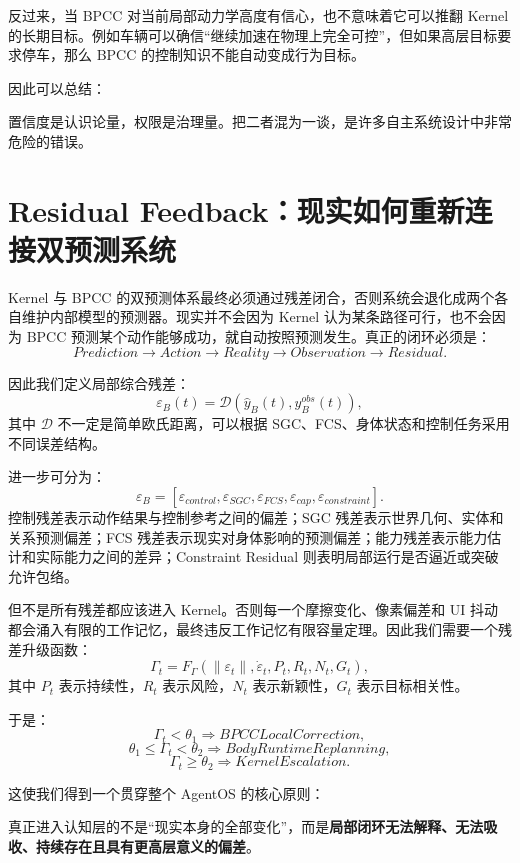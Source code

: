 反过来，当 BPCC 对当前局部动力学高度有信心，也不意味着它可以推翻 Kernel 的长期目标。例如车辆可以确信“继续加速在物理上完全可控”，但如果高层目标要求停车，那么 BPCC 的控制知识不能自动变成行为目标。

因此可以总结：
\begin{statementbox}
\centering
{}
\end{statementbox}
置信度是认识论量，权限是治理量。把二者混为一谈，是许多自主系统设计中非常危险的错误。

\section{Residual Feedback：现实如何重新连接双预测系统}

Kernel 与 BPCC 的双预测体系最终必须通过残差闭合，否则系统会退化成两个各自维护内部模型的预测器。现实并不会因为 Kernel 认为某条路径可行，也不会因为 BPCC 预测某个动作能够成功，就自动按照预测发生。真正的闭环必须是：
\[
Prediction
\rightarrow
Action
\rightarrow
Reality
\rightarrow
Observation
\rightarrow
Residual.
\]

因此我们定义局部综合残差：
\[
\varepsilon_B(t)
=
\mathcal D
\left(
\hat y_B(t),
y_B^{obs}(t)
\right),
\]
其中 $\mathcal D$ 不一定是简单欧氏距离，可以根据 SGC、FCS、身体状态和控制任务采用不同误差结构。

进一步可分为：
\[
\varepsilon_B
=
\left[
\varepsilon_{control},
\varepsilon_{SGC},
\varepsilon_{FCS},
\varepsilon_{cap},
\varepsilon_{constraint}
\right].
\]
控制残差表示动作结果与控制参考之间的偏差；SGC 残差表示世界几何、实体和关系预测偏差；FCS 残差表示现实对身体影响的预测偏差；能力残差表示能力估计和实际能力之间的差异；Constraint Residual 则表明局部运行是否逼近或突破允许包络。

但不是所有残差都应该进入 Kernel。否则每一个摩擦变化、像素偏差和 UI 抖动都会涌入有限的工作记忆，最终违反工作记忆有限容量定理。因此我们需要一个残差升级函数：
\[
\Gamma_t
=
F_\Gamma
\left(
\|\varepsilon_t\|,
\dot\varepsilon_t,
P_t,
R_t,
N_t,
G_t
\right),
\]
其中 $P_t$ 表示持续性，$R_t$ 表示风险，$N_t$ 表示新颖性，$G_t$ 表示目标相关性。

于是：
\[
\Gamma_t<\theta_1
\Rightarrow
BPCCLocalCorrection,
\]
\[
\theta_1\leq\Gamma_t<\theta_2
\Rightarrow
BodyRuntimeReplanning,
\]
\[
\Gamma_t\geq\theta_2
\Rightarrow
KernelEscalation.
\]

这使我们得到一个贯穿整个 AgentOS 的核心原则：
\begin{statementbox}
\centering
{}
\end{statementbox}
真正进入认知层的不是“现实本身的全部变化”，而是\textbf{局部闭环无法解释、无法吸收、持续存在且具有更高层意义的偏差}。

